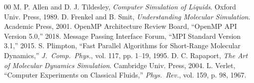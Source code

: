 \documentclass[conference]{IEEEtran}
\begin{document}
\begin{thebibliography}{00}
 M. P. Allen and D. J. Tildesley, \emph{Computer Simulation of Liquids}. Oxford Univ. Press, 1989.
 D. Frenkel and B. Smit, \emph{Understanding Molecular Simulation}. Academic Press, 2001.
 OpenMP Architecture Review Board, ``OpenMP API Version 5.0,'' 2018.
 Message Passing Interface Forum, ``MPI Standard Version 3.1,'' 2015.
 S. Plimpton, ``Fast Parallel Algorithms for Short-Range Molecular Dynamics,'' \emph{J.\ Comp.\ Phys.}, vol. 117, pp. 1--19, 1995.
 D. C. Rapaport, \emph{The Art of Molecular Dynamics Simulation}. Cambridge Univ. Press, 2004.
 L. Verlet, ``Computer Experiments on Classical Fluids,'' \emph{Phys.\ Rev.}, vol. 159, p. 98, 1967.
\end{thebibliography}
\end{document}
